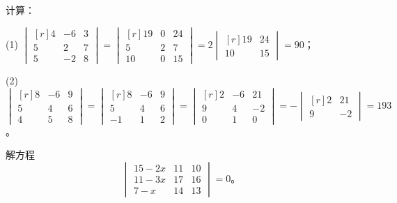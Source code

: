 \liti 计算：


\jie

(1) \quad $
\begin{vmatrix*}[r]
    4 & -6 & 3 \\
    5 & 2 & 7 \\
    5 & -2 & 8
\end{vmatrix*}
=   \begin{vmatrix*}[r]
        19 & 0 & 24 \\
        5 & 2 & 7 \\
        10 & 0 & 15
    \end{vmatrix*}
= 2 \begin{vmatrix*}[r]
        19 & 24 \\
        10 & 15
    \end{vmatrix*}
= 90
$；

(2) \quad $
\begin{vmatrix*}[r]
    8 & -6 & 9 \\
    5 & 4 & 6 \\
    4 & 5 & 8
\end{vmatrix*}
=   \begin{vmatrix*}[r]
        8 & -6 & 9 \\
        5 & 4 & 6 \\
        -1 & 1 & 2
    \end{vmatrix*}
=   \begin{vmatrix*}[r]
        2 & -6 & 21 \\
        9 & 4 & -2 \\
        0 & 1 & 0
    \end{vmatrix*}
= - \begin{vmatrix*}[r]
        2 & 21 \\
        9 & -2
    \end{vmatrix*}
= 193
$。


\liti 解方程
$$
\begin{vmatrix}
    15 - 2x & 11 & 10 \\
    11 - 3x & 17 & 16 \\
     7 - x  & 14 & 13
\end{vmatrix} = 0 \text{。}
$$

